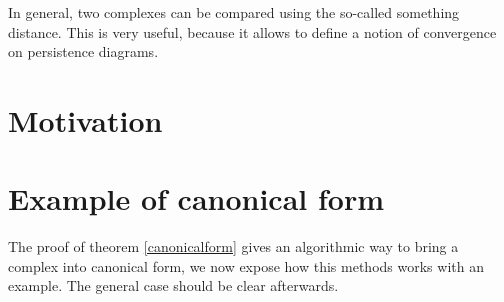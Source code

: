 In general, two complexes can be compared using the so-called {\color{red} something} distance.
This is very useful, because it allows to define a notion of convergence on persistence diagrams.

\section{Motivation}






%
%
%
%
%

%
%


\section{Example of canonical form}

The proof of theorem \ref{canonicalform} gives an
algorithmic way to bring a complex into canonical form, 
we now expose how this methods works with an example. 
The general case should be clear afterwards.



